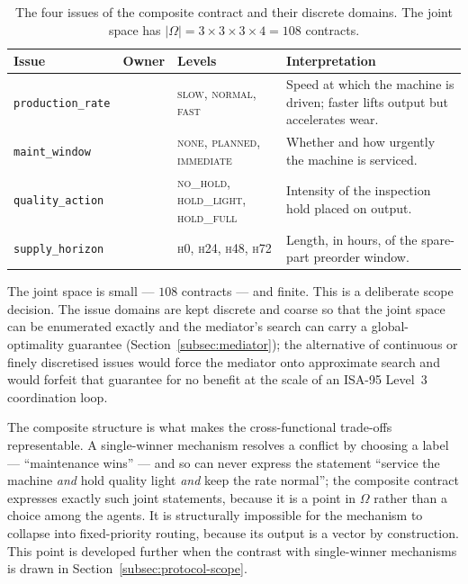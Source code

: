 \begin{table}[ht]
\centering
\caption{The four issues of the composite contract and their discrete
domains. The joint space has $|\Omega| = 3 \times 3 \times 3 \times 4 =
108$ contracts.}
\label{tab:issues}
\small
\begin{tabularx}{\textwidth}{@{}l l l X@{}}
\toprule
\textbf{Issue} & \textbf{Owner} & \textbf{Levels} & \textbf{Interpretation} \\
\midrule
\texttt{production\_rate} & \PSA{} & \textsc{slow}, \textsc{normal}, \textsc{fast}
  & Speed at which the machine is driven; faster lifts output but
    accelerates wear. \\
\addlinespace
\texttt{maint\_window} & \PMA{} & \textsc{none}, \textsc{planned}, \textsc{immediate}
  & Whether and how urgently the machine is serviced. \\
\addlinespace
\texttt{quality\_action} & \QCA{} & \textsc{no\_hold}, \textsc{hold\_light}, \textsc{hold\_full}
  & Intensity of the inspection hold placed on output. \\
\addlinespace
\texttt{supply\_horizon} & \SCA{} & \textsc{h0}, \textsc{h24}, \textsc{h48}, \textsc{h72}
  & Length, in hours, of the spare-part preorder window. \\
\bottomrule
\end{tabularx}
\end{table}

The joint space is small --- $108$ contracts --- and finite. This is a
deliberate scope decision. The issue domains are kept discrete and
coarse so that the joint space can be enumerated exactly and the
mediator's search can carry a global-optimality guarantee
(Section~\ref{subsec:mediator}); the alternative of continuous or
finely discretised issues would force the mediator onto approximate
search and would forfeit that guarantee for no benefit at the scale of
an ISA-95 Level~3 coordination loop.

The composite structure is what makes the cross-functional trade-offs
representable. A single-winner mechanism resolves a conflict by choosing
a label --- ``maintenance wins'' --- and so can never express the
statement ``service the machine \emph{and} hold quality light
\emph{and} keep the rate normal''; the composite contract expresses
exactly such joint statements, because it is a point in
$\Omega$ rather than a choice among the agents. It is structurally
impossible for the mechanism to collapse into fixed-priority routing,
because its output is a vector by construction. This point is developed
further when the contrast with single-winner mechanisms is drawn in
Section~\ref{subsec:protocol-scope}.

